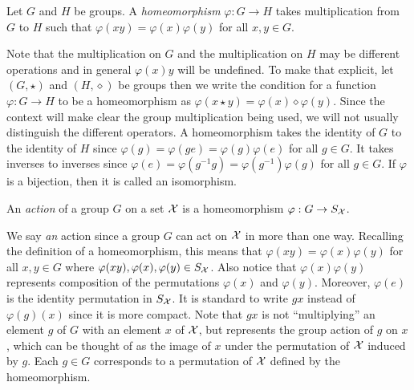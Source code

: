 \begin{definition}
Let $G$ and $H$ be groups.  A \emph{homeomorphism} $\varphi: G \to H$ takes multiplication
from $G$ to $H$ such that $\varphi(xy) = \varphi(x)\varphi(y)$ for all $x, y \in G$.
\end{definition}

Note that the multiplication on $G$ and the multiplication on $H$ may be different operations
and in general $\varphi(x)y$ will be undefined.
To make that explicit, let $(G, \star)$ and $(H, \diamond)$ be groups then we write the
condition for a function $\varphi: G \to H$ to be a homeomorphism as
$\varphi(x \star y) = \varphi(x)  \diamond \varphi(y)$.  
Since the context will make clear the group multiplication being used, we will not usually
distinguish the different  operators.
A homeomorphism takes the identity of $G$ to the identity of $H$
since $\varphi(g) = \varphi(ge) = \varphi(g)\varphi(e)$ for all $g \in G$. It takes inverses to 
inverses since $\varphi(e) = \varphi(g^{-1}g) = \varphi(g^{-1})\varphi(g)$ for all $g \in G$.
If $\varphi$ is a bijection, then it is called an isomorphism.

\begin{definition}
An \emph{action} of a group $G$ on a set $\mathcal{X}$ is a homeomorphism $\varphi: G \to S_{\mathcal{X}}$.
\end{definition}

We say \emph{an} action since a group $G$ can act on $\mathcal{X}$ in more than one way. Recalling the
definition of a homeomorphism, this means that $\varphi(xy) = \varphi(x)\varphi(y)$ for all
$x, y \in G$ where $\varphi(xy), \varphi(x), \varphi(y) \in S_{\mathcal{X}}$.  Also notice that
$\varphi(x)\varphi(y)$ represents composition of the permutations $\varphi(x)$ and 
$\varphi(y)$.  Moreover, $\varphi(e)$ is the identity permutation in $S_{\mathcal{X}}$.
It is standard to write $gx$ instead of $\varphi(g)(x)$ since it is more compact.
Note that $gx$ is not ``multiplying'' an element $g$ of $G$ with an element $x$ of $\mathcal{X}$,
but represents the group action
of $g$ on $x$, which can be thought of as the image of $x$ under the permutation of $\mathcal{X}$
induced by $g$.  Each $g \in G$ corresponds to a permutation of $\mathcal{X}$ defined by the
homeomorphism.

%
%



